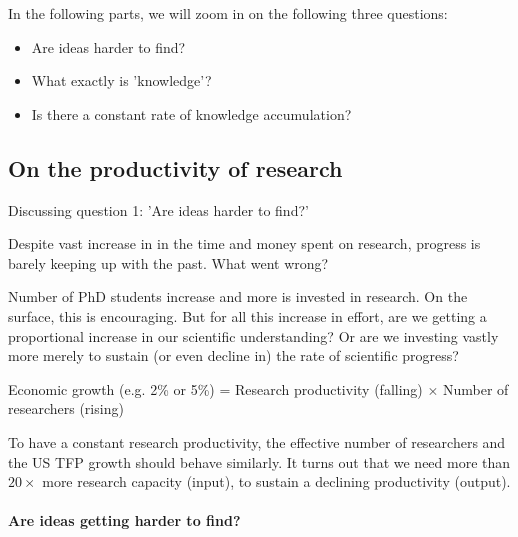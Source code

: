 In the following parts, we will zoom in on the following three questions:
\begin{itemize}
    \item Are ideas harder to find?
    \item What exactly is 'knowledge'?
    \item Is there a constant rate of knowledge accumulation?
\end{itemize}

\subsection{On the productivity of research}

Discussing question 1: 'Are ideas harder to find?'

\vspace{1\baselineskip}

Despite vast increase in in the time and money spent on research, progress
is barely keeping up with the past. What went wrong?

\vspace{1\baselineskip}

Number of PhD students increase and more is invested in research. On the surface,
this is encouraging. But for all this increase in effort, are we getting a proportional
increase in our scientific understanding? Or are we investing vastly more
merely to sustain (or even decline in) the rate of scientific progress?

\vspace{1\baselineskip}

Economic growth (e.g. 2\% or 5\%) = Research productivity (falling) $\times$
Number of researchers (rising)

\vspace{1\baselineskip}

To have a constant research productivity, the effective number of researchers
and the US TFP growth should behave similarly. It turns out that we need more
than $20 \times$ more research capacity (input), to sustain a declining
productivity (output).

\vspace{1\baselineskip}

\paragraph{Are ideas getting harder to find?}


